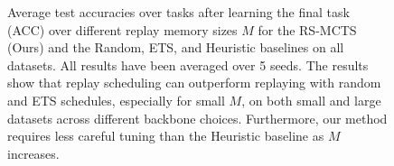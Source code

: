 
\begin{figure}[t]
  \centering
  \setlength{\figwidth}{0.28\textwidth}
  \setlength{\figheight}{.13\textheight}%
  
  \vspace{-4mm}
  \caption{Average test accuracies over tasks after learning the final task (ACC) over different replay memory sizes $M$ for the RS-MCTS (Ours) and the Random, ETS, and Heuristic baselines on all datasets.
  All results have been averaged over 5 seeds. The results show that replay scheduling can outperform replaying with random and ETS schedules, %
  especially for small $M$, on both small and large datasets across different backbone choices. Furthermore, our method requires less careful tuning than the Heuristic baseline as $M$ increases.
  }
  \vspace{-3mm}
  \label{fig:acc_over_replay_memory_size}
\end{figure}

